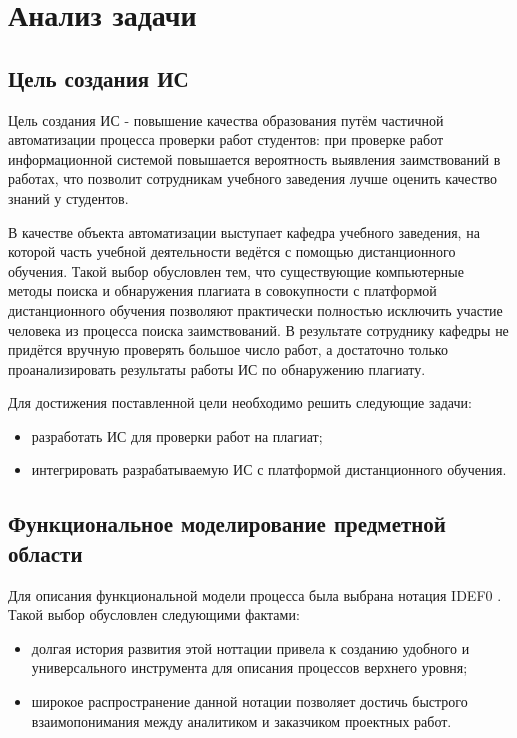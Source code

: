 \section{Анализ задачи}	

	\subsection{Цель создания ИС}

		Цель создания ИС - повышение качества образования путём частичной автоматизации процесса проверки работ студентов: при проверке работ информационной системой повышается вероятность выявления заимствований в работах, что позволит сотрудникам учебного заведения лучше оценить качество знаний у студентов.

		В качестве объекта автоматизации выступает кафедра учебного заведения, на которой часть учебной деятельности ведётся с помощью дистанционного обучения. Такой выбор обусловлен тем, что существующие компьютерные методы поиска и обнаружения плагиата в совокупности с платформой дистанционного обучения позволяют практически полностью исключить участие человека из процесса поиска заимствований. В результате сотруднику кафедры не придётся вручную проверять большое число работ, а достаточно только проанализировать результаты работы ИС по обнаружению плагиату.

		Для достижения поставленной цели необходимо решить следующие задачи:
		\begin{itemize}
			\item разработать ИС для проверки работ на плагиат;
			\item интегрировать разрабатываемую ИС с платформой дистанционного обучения.
		\end{itemize}

	\subsection{Функциональное моделирование предметной области}

		Для описания функциональной модели процесса была выбрана нотация IDEF0 \cite{idef01993}. Такой выбор обусловлен следующими фактами:
		\begin{itemize}
			\item долгая история развития этой ноттации привела к созданию удобного и универсального инструмента для описания процессов верхнего уровня;
			\item широкое распространение данной нотации позволяет достичь быстрого взаимопонимания между аналитиком и заказчиком проектных работ.
		\end{itemize}
		
